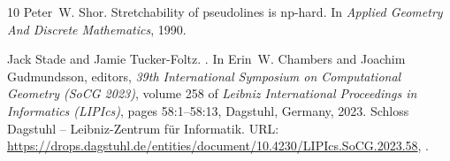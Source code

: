 \documentclass[11pt]{article}
\theoremstyle{plain}
\theoremstyle{definition}
\numberwithin{theorem}{section}
\begin{document}
\begin{thebibliography}{10}
Peter~W. Shor.
\newblock Stretchability of pseudolines is np-hard.
\newblock In {\em Applied Geometry And Discrete Mathematics}, 1990.

Jack Stade and Jamie Tucker-Foltz.
.
\newblock In Erin~W. Chambers and Joachim Gudmundsson, editors, {\em 39th International Symposium on Computational Geometry (SoCG 2023)}, volume 258 of {\em Leibniz International Proceedings in Informatics (LIPIcs)}, pages 58:1--58:13, Dagstuhl, Germany, 2023. Schloss Dagstuhl -- Leibniz-Zentrum f{\"u}r Informatik.
\newblock URL: \url{https://drops.dagstuhl.de/entities/document/10.4230/LIPIcs.SoCG.2023.58}, \href {https://doi.org/10.4230/LIPIcs.SoCG.2023.58} {}.

\end{thebibliography}
\end{document}
